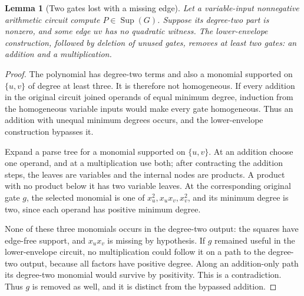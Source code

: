 \documentclass[11pt]{article}
\newcommand{\Sup}{\operatorname{Sup}}
\newtheorem{lemma}[theorem]{Lemma}
\theoremstyle{definition}
\theoremstyle{remark}
\begin{document}
\begin{lemma}[Two gates lost with a missing edge]\label{lem:lostgates}
Let a variable-input nonnegative arithmetic circuit compute $P\in\Sup(G)$. Suppose its degree-two part is nonzero, and some edge $uv$ has no quadratic witness. The lower-envelope construction, followed by deletion of unused gates, removes at least two gates: an addition and a multiplication.
\end{lemma}
\begin{proof}
The polynomial has degree-two terms and also a monomial supported on $\{u,v\}$ of degree at least three. It is therefore not homogeneous. If every addition in the original circuit joined operands of equal minimum degree, induction from the homogeneous variable inputs would make every gate homogeneous. Thus an addition with unequal minimum degrees occurs, and the lower-envelope construction bypasses it.

Expand a parse tree for a monomial supported on $\{u,v\}$. At an addition choose one operand, and at a multiplication use both; after contracting the addition steps, the leaves are variables and the internal nodes are products. A product with no product below it has two variable leaves. At the corresponding original gate $g$, the selected monomial is one of $x_u^2,x_ux_v,x_v^2$, and its minimum degree is two, since each operand has positive minimum degree.

None of these three monomials occurs in the degree-two output: the squares have edge-free support, and $x_ux_v$ is missing by hypothesis. If $g$ remained useful in the lower-envelope circuit, no multiplication could follow it on a path to the degree-two output, because all factors have positive degree. Along an addition-only path its degree-two monomial would survive by positivity. This is a contradiction. Thus $g$ is removed as well, and it is distinct from the bypassed addition.
\end{proof}
\end{document}
